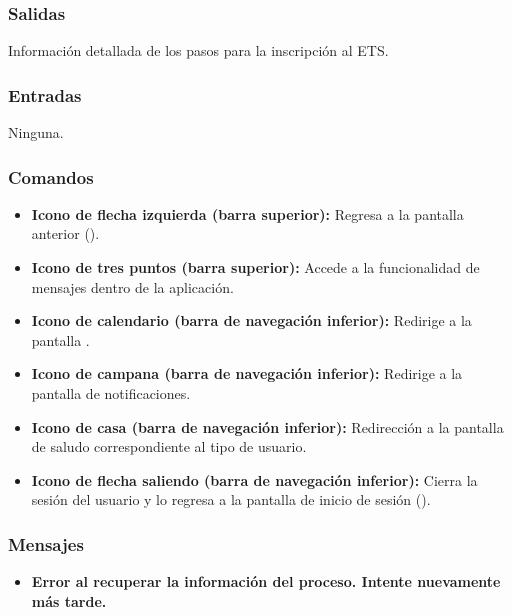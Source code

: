 \subsubsection{Salidas}
Información detallada de los pasos para la inscripción al ETS.

\subsubsection{Entradas}
Ninguna.

\subsubsection{Comandos}
\begin{itemize}
	\item \textbf{Icono de flecha izquierda (barra superior):} Regresa a la pantalla anterior ().
	\item \textbf{Icono de tres puntos (barra superior):} Accede a la funcionalidad de mensajes dentro de la aplicación.
	\item \textbf{Icono de calendario (barra de navegación inferior):} Redirige a la pantalla .
	\item \textbf{Icono de campana (barra de navegación inferior):} Redirige a la pantalla de notificaciones.
	\item \textbf{Icono de casa (barra de navegación inferior):} Redirección a la pantalla de saludo correspondiente al tipo de usuario.
	\item \textbf{Icono de flecha saliendo (barra de navegación inferior):} Cierra la sesión del usuario y lo regresa a la pantalla de inicio de sesión ().
\end{itemize}

\subsubsection{Mensajes}
\begin{itemize}
	\item \textbf{Error al recuperar la información del proceso. Intente nuevamente más tarde.}
\end{itemize}

